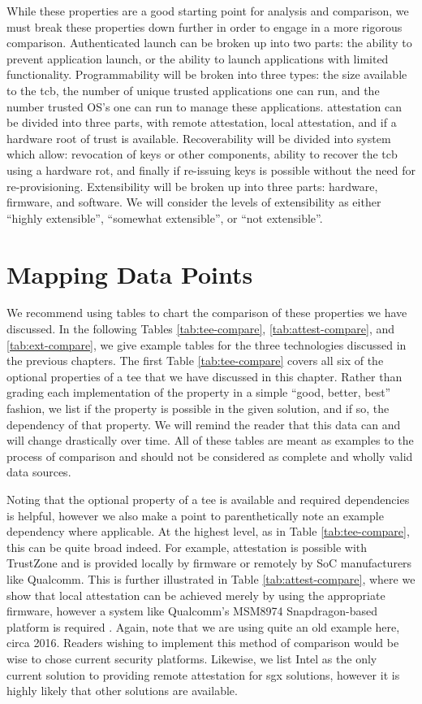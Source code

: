 While these properties are a good starting point for analysis and comparison, we must break these properties down further in order to engage in a more rigorous comparison. Authenticated launch can be broken up into two parts: the ability to prevent application launch, or the ability to launch applications with limited functionality. Programmability will be broken into three types: the size available to the \gls{tcb}, the number of unique trusted applications one can run, and the number trusted OS's one can run to manage these applications. \Gls{attestation} can be divided into three parts, with remote attestation, local attestation, and if a hardware root of trust is available. Recoverability will be divided into system which allow: revocation of keys or other components, ability to recover the \gls{tcb} using a hardware \gls{rot}, and finally if re-issuing keys is possible without the need for re-provisioning. Extensibility will be broken up into three parts: hardware, firmware, and software. We will consider the levels of extensibility as either ``highly extensible'', ``somewhat extensible'', or ``not extensible''.

\section{Mapping Data Points}

We recommend using tables to chart the comparison of these properties we have discussed. In the following Tables \ref{tab:tee-compare}, \ref{tab:attest-compare}, and \ref{tab:ext-compare}, we give example tables for the three technologies discussed in the previous chapters. The first Table \ref{tab:tee-compare} covers all six of the optional properties of a \gls{tee} that we have discussed in this chapter. Rather than grading each implementation of the property in a simple ``good, better, best'' fashion, we list if the property is possible in the given solution, and if so,  the dependency of that property. We will remind the reader that this data can and will change drastically over time. All of these tables are meant as examples to the process of comparison and should not be considered as complete and wholly valid data sources.

Noting that the optional property of a \gls{tee} is available and required dependencies is helpful, however we also make a point to parenthetically note an example dependency where applicable. At the highest level, as in Table \ref{tab:tee-compare}, this can be quite broad indeed. For example, \gls{attestation} is possible with TrustZone and is provided locally by firmware or remotely by SoC manufacturers like Qualcomm. This is further illustrated in Table \ref{tab:attest-compare}, where we show that local \gls{attestation} can be achieved merely by using the appropriate firmware, however a system like Qualcomm's MSM8974 Snapdragon-based platform is required \cite{spensky2016sok}. Again, note that we are using quite an old example here, circa 2016. Readers wishing to implement this method of comparison would be wise to chose current security platforms. Likewise, we list Intel as the only current solution to providing remote \gls{attestation} for \gls{sgx} solutions, however it is highly likely that other solutions are available.

